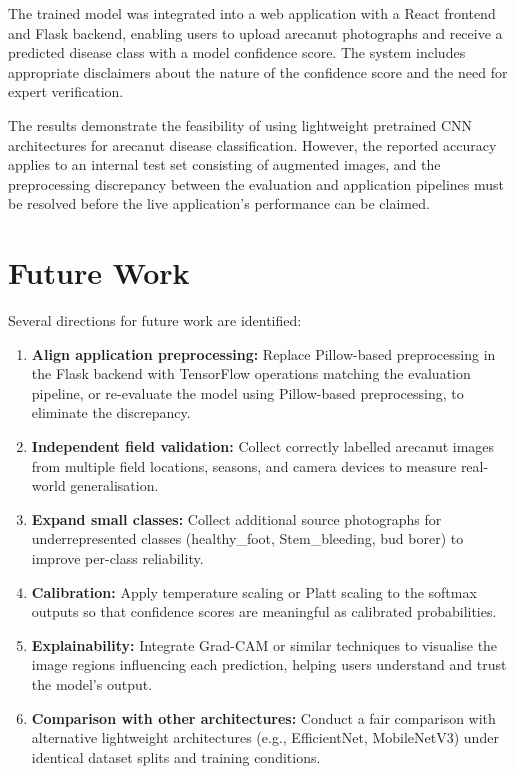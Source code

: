 \documentclass[conference]{IEEEtran}
\begin{document}
The trained model was integrated into a web application with a React frontend and Flask backend, enabling users to upload arecanut photographs and receive a predicted disease class with a model confidence score. The system includes appropriate disclaimers about the nature of the confidence score and the need for expert verification.

The results demonstrate the feasibility of using lightweight pretrained CNN architectures for arecanut disease classification. However, the reported accuracy applies to an internal test set consisting of augmented images, and the preprocessing discrepancy between the evaluation and application pipelines must be resolved before the live application's performance can be claimed.

\section{Future Work}
\label{sec:future}

Several directions for future work are identified:
\begin{enumerate}
    \item \textbf{Align application preprocessing:} Replace Pillow-based preprocessing in the Flask backend with TensorFlow operations matching the evaluation pipeline, or re-evaluate the model using Pillow-based preprocessing, to eliminate the discrepancy.
    \item \textbf{Independent field validation:} Collect correctly labelled arecanut images from multiple field locations, seasons, and camera devices to measure real-world generalisation.
    \item \textbf{Expand small classes:} Collect additional source photographs for underrepresented classes (healthy\_foot, Stem\_bleeding, bud borer) to improve per-class reliability.
    \item \textbf{Calibration:} Apply temperature scaling or Platt scaling to the softmax outputs so that confidence scores are meaningful as calibrated probabilities.
    \item \textbf{Explainability:} Integrate Grad-CAM or similar techniques to visualise the image regions influencing each prediction, helping users understand and trust the model's output.
    \item \textbf{Comparison with other architectures:} Conduct a fair comparison with alternative lightweight architectures (e.g., EfficientNet, MobileNetV3) under identical dataset splits and training conditions.
\end{enumerate}
\end{document}
